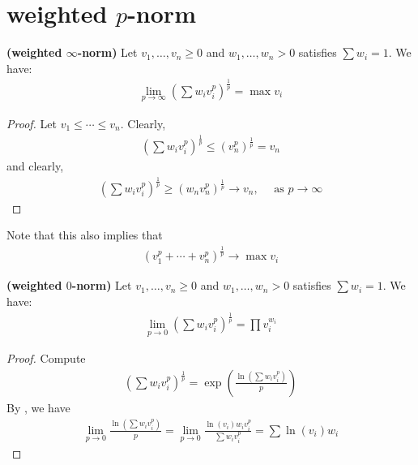 \documentclass{report}
\begin{document}
\section{weighted $p$-norm}
\begin{theorem}
\textbf{(weighted $\infty$-norm)} Let $v_1,\dots ,v_n \geq 0$ and $w_1,\dots ,w_n >0$ satisfies $\sum w_i=1$. We have: 
\begin{align*}
\lim_{p\to \infty} \left(\sum w_i v_i^p   \right)^{\frac{1}{p}}= \max v_i
\end{align*}
\end{theorem}
\begin{proof}
Let $v_1\leq \cdots \leq v_n$. Clearly, 
\begin{align*}
  \left(\sum w_i v_i^p \right)^{\frac{1}{p}} \leq \left( v_n^p \right)^{\frac{1}{p}}= v_n 
\end{align*}
and clearly, 
\begin{align*}
 \left( \sum w_i v_i^{p} \right)^{\frac{1}{p}} \geq (w_nv_n^p)^{\frac{1}{p}} \rightarrow v_n,\quad \text{ as }p\rightarrow  \infty
\end{align*}
\end{proof}
Note that this also implies that 
\begin{align*}
  (v_1^p+\cdots + v_n^p)^{\frac{1}{p}}\rightarrow \max v_i
\end{align*}
\begin{theorem}
\textbf{(weighted $0$-norm)}  Let $v_1,\dots ,v_n \geq 0$ and $w_1,\dots ,w_n >0$ satisfies $\sum w_i=1$. We have: 
\begin{align*}
\lim_{p\to 0} \left(\sum w_i v_i^p   \right)^{\frac{1}{p}}= \prod v_i^{w_i}
\end{align*}
\end{theorem}
\begin{proof}
Compute 
\begin{align*}
  \left( \sum w_iv_i^p \right)^{\frac{1}{p}}= \exp \left(\frac{\ln \left(\sum w_iv_i^p\right)}{p}  \right)
\end{align*}
By  , we have
\begin{align*}
\lim_{p\to 0} \frac{\ln \left(\sum w_iv_i^p \right)}{p} = \lim_{p\to 0}\frac{ \ln (v_i)w_iv_i^p}{\sum w_iv_i^p}= \sum  \ln (v_i)w_i
\end{align*}

\end{proof}
\end{document}
